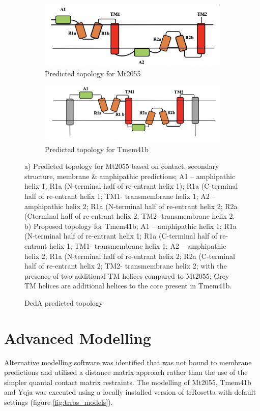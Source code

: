 \begin{figure}[th!]
    \centering %
\begin{subfigure}{0.5\textwidth}
  \includegraphics[width=\linewidth]{Results/w9_topology.png}
  \caption{Predicted topology for Mt2055}
  \label{fig:0}
\end{subfigure}\hfil %
\begin{subfigure}{0.5\textwidth}
  \includegraphics[width=\linewidth]{Results/tm_topology.png}
  \caption{Predicted topology for Tmem41b}
  \label{fig:1}
\end{subfigure}
\caption{DedA predicted topology}
\small
a) Predicted topology for Mt2055 based on contact, secondary structure, membrane & amphipathic predictions;
A1 – amphipathic helix 1; R1a (N-terminal half of re-entrant helix 1); R1a (C-terminal half of re-entrant helix 1; TM1- transmembrane helix 1; A2 – amphipathic helix 2; R1a (N-terminal half of re-entrant helix 2; R2a (Cterminal half of re-entrant helix 2; TM2- transmembrane helix 2.
b) Proposed topology for Tmem41b; A1 – amphipathic helix 1; R1a (N-terminal half of re-entrant helix 1; R1a (C-terminal half of re-entrant helix 1; TM1- transmembrane helix 1; A2 – amphipathic helix 2; R1a (N-terminal half of re-entrant helix 2; R2a (C-terminal half of re-entrant helix 2; TM2- transmembrane helix 2; with the presence of two-additional TM helices compared to Mt2055; Grey TM helices are additional helices to the core present in Tmem41b.
\label{fig:topology}
\end{figure}


\section{Advanced Modelling}
Alternative modelling software was identified that was not bound to membrane predictions and utilised a distance matrix approach rather than the use of the simpler quantal contact matrix restraints.  The modelling of Mt2055, Tmem41b and Yqja was executed using a locally installed version of trRosetta \cite{Yang2020} with default settings (figure  \ref{fig:trros_models}).

